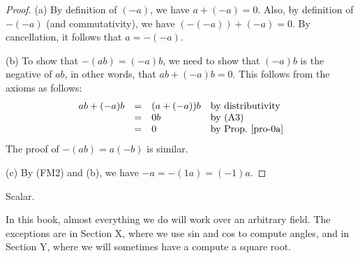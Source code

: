 {\begin{proof}
  (a) By definition of $(-a)$, we have $a+(-a)=0$. Also, by definition
  of $-(-a)$ (and commutativity), we have $(-(-a))+(-a) = 0$. By
  cancellation, it follows that $a=-(-a)$.

  (b) To show that $-(ab) = (-a)b$, we need to show that $(-a)b$ is
  the negative of $ab$, in other words, that $ab+(-a)b=0$. This
  follows from the axioms as follows: 
  \[ \begin{array}{llll}
    ab+(-a)b &=& (a+(-a))b &\mbox{by distributivity}\\
    &=& 0b &\mbox{by (A3)} \\
    &=& 0 &\mbox{by Prop.~\ref{pro-0a}}
  \end{array}
  \]
  The proof of $-(ab)=a(-b)$ is similar.

  (c) By (FM2) and (b), we have $-a = -(1a) = (-1)a$. \eot
\end{proof}



Scalar.

In this book, almost everything we do will work over an arbitrary
field. The exceptions are in Section X, where we use sin and cos to
compute angles, and in Section Y, where we will sometimes have a
compute a square root.

}
